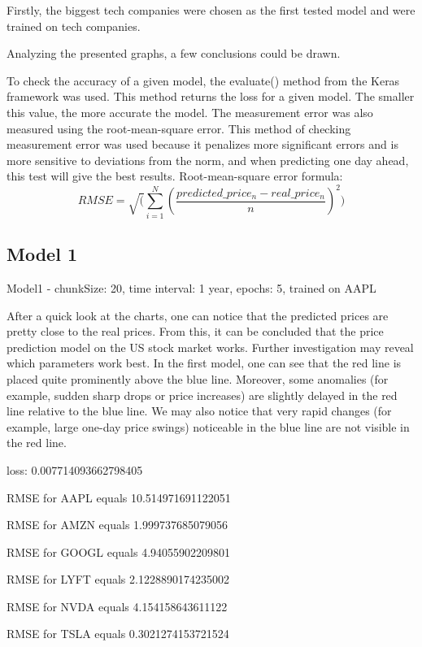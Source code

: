 Firstly, the biggest tech companies were chosen as the first tested model and were trained on tech companies.

Analyzing the presented graphs, a few conclusions could be drawn.

To check the accuracy of a given model, the evaluate() method from the Keras framework was used. This method returns the loss for a given model. The smaller this value, the more accurate the model. The measurement error was also measured using the root-mean-square error. This method of checking measurement error was used because it penalizes more significant errors and is more sensitive to deviations from the norm, and when predicting one day ahead, this test will give the best results.
Root-mean-square error formula:
\[ RMSE = \sqrt(\sum\limits_{i=1}^N (\frac{predicted{\_}price_n - real{\_}price_n}{n})^2) \]

\subsection{Model 1}

Model1 - chunkSize: 20, time interval: 1 year, epochs: 5, trained on AAPL\par\bigskip
After a quick look at the charts,  one can notice that the predicted prices are pretty close to the real prices. From this, it can be concluded that the price prediction model on the US stock market works. Further investigation may reveal which parameters work best.
In the first model, one can see that the red line is placed quite prominently above the blue line. Moreover, some anomalies (for example, sudden sharp drops or price increases) are slightly delayed in the red line relative to the blue line. We may also notice that very rapid changes (for example, large one-day price swings) noticeable in the blue line are not visible in the red line.
\par\bigskip
loss: 0.007714093662798405\par
RMSE for AAPL equals 10.514971691122051\par
RMSE for AMZN equals 1.999737685079056\par
RMSE for GOOGL equals 4.94055902209801\par
RMSE for LYFT equals 2.1228890174235002\par
RMSE for NVDA equals 4.154158643611122\par
RMSE for TSLA equals 0.3021274153721524\par

